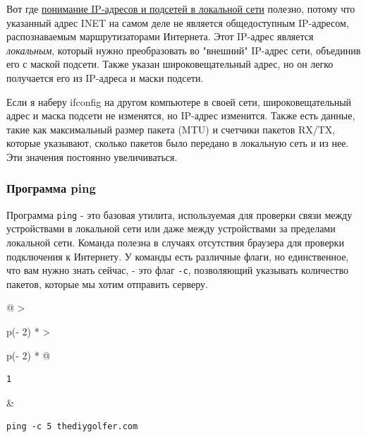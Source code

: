 \documentclass{article}
\begin{document}
Вот где \href{blog/2019/ip-addresses-netmasks}{понимание IP-адресов и
подсетей в локальной сети} полезно, потому что указанный адрес INET на
самом деле не является общедоступным IP-адресом, распознаваемым
маршрутизаторами Интернета. Этот IP-адрес является \emph{локальным},
который нужно преобразовать во "внешний" IP-адрес сети, объединив его с
маской подсети. Также указан широковещательный адрес, но он легко
получается его из IP-адреса и маски подсети.

Если я наберу ifconfig на другом компьютере в своей сети,
широковещательный адрес и маска подсети не изменятся, но IP-адрес
изменится. Также есть данные, такие как максимальный размер пакета (MTU)
и счетчики пакетов RX/TX, которые указывают, сколько пакетов было
передано в локальную сеть и из нее. Эти значения постоянно
увеличиваться.

\hypertarget{ping}{%
\subsubsection{\texorpdfstring{\protect\hyperlink{ping}{}Программа
ping}{Программа ping}}\label{ping}}

Программа \texttt{ping} - это базовая утилита, используемая для проверки
связи между устройствами в локальной сети или даже между устройствами за
пределами локальной сети. Команда полезна в случаях отсутствия браузера
для проверки подключения к Интернету. У команды есть различные флаги, но
единственное, что вам нужно знать сейчас, - это флаг \texttt{-c},
позволяющий указывать количество пакетов, которые мы хотим отправить
серверу.

\begin{longtable}[]{@{}
  >{\raggedright\arraybackslash}p{(\columnwidth - 2\tabcolsep) * }
  >{\raggedright\arraybackslash}p{(\columnwidth - 2\tabcolsep) * }@{}}
\toprule
\endhead
\begin{minipage}[t]{\linewidth}\raggedright
\begin{verbatim}
1
\end{verbatim}
\end{minipage} & \begin{minipage}[t]{\linewidth}\raggedright
\begin{verbatim}
ping -c 5 thediygolfer.com
\end{verbatim}
\end{minipage} \\ \addlinespace
\bottomrule
\end{longtable}
\end{document}
